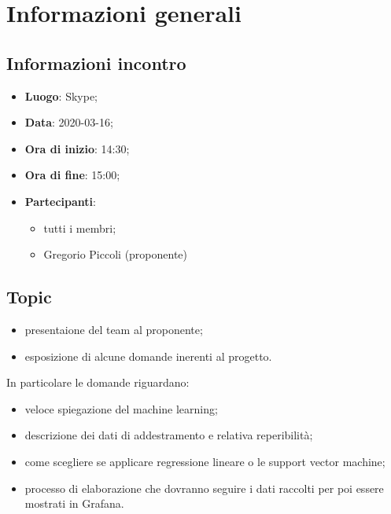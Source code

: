 \section{Informazioni generali}
\subsection{Informazioni incontro}
\begin{itemize}
\item \textbf{Luogo}: Skype;
\item \textbf{Data}: 2020-03-16;
\item \textbf{Ora di inizio}: 14:30;
\item \textbf{Ora di fine}: 15:00;
\item \textbf{Partecipanti}:
	\begin{itemize}
		\item tutti i membri;
		\item Gregorio Piccoli (proponente)
	\end{itemize}
\end{itemize}

\subsection{Topic}
\begin{itemize}
	\item presentaione del team al proponente;
	\item esposizione di alcune domande inerenti al progetto.
\end{itemize}
In particolare le domande riguardano:
\begin{itemize}
	\item veloce spiegazione del machine learning\glo;
	\item descrizione dei dati di addestramento e relativa reperibilità;
	\item come scegliere se applicare regressione lineare o le support vector machine;
	\item processo di elaborazione che dovranno seguire i dati raccolti per poi essere mostrati in Grafana.
\end{itemize}